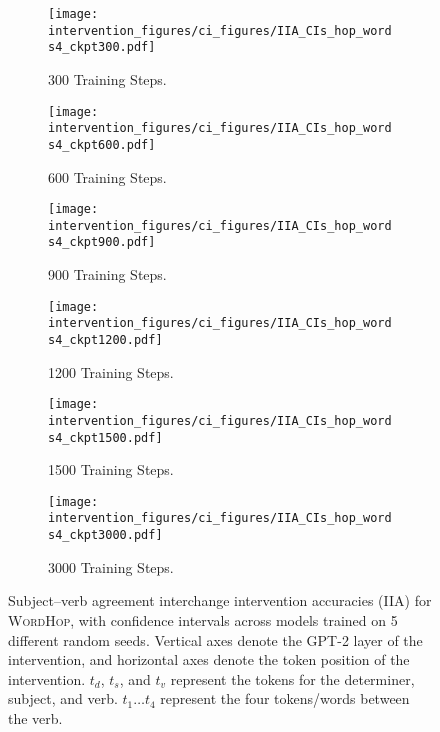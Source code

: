 \documentclass[11pt]{article}
\begin{document}
\begin{figure*}
    \centering
     \begin{subfigure}{0.49\textwidth}
         \centering
         \texttt{[image: intervention\_figures/ci\_figures/IIA\_CIs\_hop\_words4\_ckpt300.pdf]}
         \caption{300 Training Steps.}
     \end{subfigure}
     \begin{subfigure}{0.49\textwidth}
         \centering
         \texttt{[image: intervention\_figures/ci\_figures/IIA\_CIs\_hop\_words4\_ckpt600.pdf]}
         \caption{600 Training Steps.}
     \end{subfigure}
     \begin{subfigure}{0.49\textwidth}
         \centering
         \texttt{[image: intervention\_figures/ci\_figures/IIA\_CIs\_hop\_words4\_ckpt900.pdf]}
         \caption{900 Training Steps.}
     \end{subfigure}
     \begin{subfigure}{0.49\textwidth}
         \centering
         \texttt{[image: intervention\_figures/ci\_figures/IIA\_CIs\_hop\_words4\_ckpt1200.pdf]}
         \caption{1200 Training Steps.}
     \end{subfigure}
     \begin{subfigure}{0.49\textwidth}
         \centering
         \texttt{[image: intervention\_figures/ci\_figures/IIA\_CIs\_hop\_words4\_ckpt1500.pdf]}
         \caption{1500 Training Steps.}
     \end{subfigure}
     \begin{subfigure}{0.49\textwidth}
         \centering
         \texttt{[image: intervention\_figures/ci\_figures/IIA\_CIs\_hop\_words4\_ckpt3000.pdf]}
         \caption{3000 Training Steps.}
     \end{subfigure}
    \caption{Subject--verb agreement interchange intervention accuracies (IIA) for
    \textsc{WordHop}, with confidence intervals across models trained on 5 different random seeds. Vertical axes denote the GPT-2 layer of the intervention, and horizontal axes denote the token position of the intervention. $t_d$, $t_s$, and $t_v$ represent the tokens for the determiner, subject, and verb. $t_1 \dots t_4$ represent the four tokens/words between the verb.}
    \label{fig:iia_ci_hop_words4}
\end{figure*}
\end{document}
